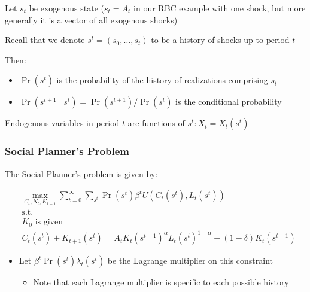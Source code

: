 \documentclass[10pt]{article}
\begin{document}
Let $s_t$ be exogenous state ($s_t=A_t$ in our RBC example with one shock, but more generally it is a vector of all exogenous shocks)

Recall that we denote $s^t=\left(s_0, \ldots, s_t\right)$ to be a history of shocks up to period $t$

Then:

\begin{itemize}
    \item $\operatorname{Pr}\left(s^t\right)$ is the probability of the history of realizations comprising $s_t$
    \item $\operatorname{Pr}\left(s^{t+1} \mid s^t\right)=\operatorname{Pr}\left(s^{t+1}\right) / \operatorname{Pr}\left(s^t\right)$ is the conditional probability
\end{itemize}

Endogenous variables in period $t$ are functions of $s^t: X_t=X_t\left(s^t\right)$




\subsubsection{Social Planner's Problem}

The Social Planner's problem is given by:

\begin{align}
    &\max _{C_t, N_t, K_{t+1}} \sum_{t=0}^{\infty} \sum_{s^t} \operatorname{Pr}\left(s^t\right) \beta^t U\left(C_t\left(s^t\right), L_t\left(s^t\right)\right) \label{eq:l11_sp_problem_long} \\
    &\text{s.t.} \\
    &K_0 \text{ is given} \\
    &C_t\left(s^t\right)+K_{t+1}\left(s^t\right)=A_t K_t\left(s^{t-1}\right)^\alpha L_t\left(s^t\right)^{1-\alpha}+(1-\delta) K_t\left(s^{t-1}\right)
\end{align}

\begin{itemize}
    \item Let $\beta^t \operatorname{Pr}\left(s^t\right) \lambda_t\left(s^t\right)$ be the Lagrange multiplier on this constraint 
        \begin{itemize}
            \item Note that each Lagrange multiplier is specific to each possible history
        \end{itemize}
\end{itemize}
\end{document}
